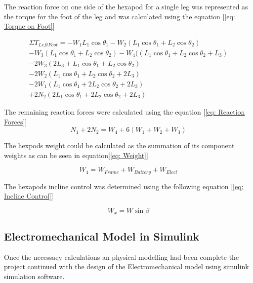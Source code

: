 The reaction force on one side of the hexapod for a single leg was represented as the torque for the foot of the leg and was calculated using the equation [\ref{eq: Torque on Foot}]

\begin{multline} \label{eq: Torque on Foot}
\Sigma T_{Left Foot} = -W_1 L_1 \cos \theta_1 - W_2 (L_1 \cos \theta_1 + L_2 \cos \theta_2)\\ - W_3 (L_1 \cos \theta_1 + L_2 \cos \theta_2) - W_4 ((L_1 \cos \theta_1 + L_2 \cos \theta_2 + L_3)\\ -2W_3 (2L_3 + L_1 \cos \theta_1 + L_2 \cos \theta_2)\\
- 2W_2 (L_1 \cos \theta_1 + L_2 \cos \theta_2 +2L_3)\\ - 2W_1 (L_1 \cos \theta_1 + 2L_2 \cos \theta_2 +2L_3)\\ + 2N_2 (2L_1 \cos \theta_1 + 2L_2 \cos \theta_2 +2L_3)
\end{multline}

The remaining reaction forces were calculated using the equation [\ref{eq: Reaction Forces}]
\begin{equation} \label{eq: Reaction Forces}
N_1+2N_2 = W_4+ 6(W_1+W_2+W_3 )
\end{equation}

The hexpods weight could be calculated as the summation of its component weights as can be seen in equation[\ref{eq: Weight}]

\begin{equation} \label{eq: Weight}
W_4 = W_{Frame}+W_{Battery}+W_{Elect}
\end{equation}


The hexapods incline control was determined using the following equation [\ref{eq: Incline Control}]

\begin{equation} \label{eq: Incline Control}
W_x = W \sin \beta
\end{equation}





\subsection{Electromechanical Model in Simulink}
Once the necessaey calculations an physical modelling had been complete the project continued with the design of the Electromechanical model using simulink simulation software.\\

